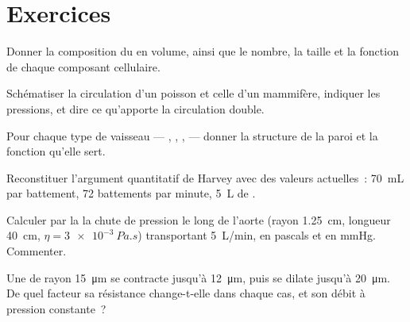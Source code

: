 \section{Exercices}

\begin{exercise}[$\star$]\label{exo:b2:blood-circulation:1}
Donner la composition du  en volume, ainsi que le nombre, la taille
et la fonction de chaque composant cellulaire.
\end{exercise}

\begin{exercise}[$\star$]\label{exo:b2:blood-circulation:2}
Schématiser la circulation d'un poisson et celle d'un mammifère,
indiquer les pressions, et dire ce qu'apporte la circulation double.
\end{exercise}

\begin{exercise}[$\star$]\label{exo:b2:blood-circulation:3}
Pour chaque type de vaisseau --- , , , 
--- donner la structure de la paroi et la fonction qu'elle sert.
\end{exercise}

\begin{exercise}[$\star$]\label{exo:b2:blood-circulation:4}
Reconstituer l'argument quantitatif de Harvey avec des valeurs
actuelles~: \qty{70}{mL} par battement, \num{72} battements par minute,
\qty{5}{L} de .
\end{exercise}

\begin{exercise}[$\star\star$]\label{exo:b2:blood-circulation:5}
Calculer par la  la chute de pression le long de
l'aorte (rayon \qty{1.25}{cm}, longueur \qty{40}{cm},
$\eta = \qty{3e-3}{Pa.s}$) transportant \qty{5}{L/min}, en pascals et
en mmHg. Commenter.
\end{exercise}

\begin{exercise}[$\star\star$]\label{exo:b2:blood-circulation:6}
Une  de rayon \qty{15}{\micro m} se contracte jusqu'à
\qty{12}{\micro m}, puis se dilate jusqu'à \qty{20}{\micro m}. De quel
facteur sa résistance change-t-elle dans chaque cas, et son débit à
pression constante~?
\end{exercise}

